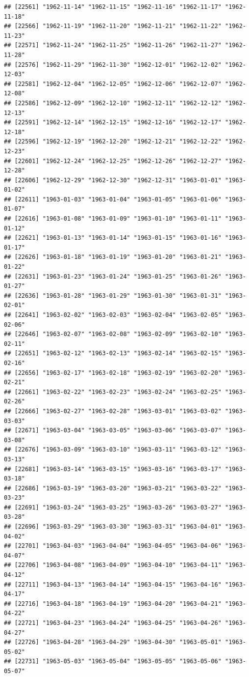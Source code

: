 \documentclass{article}\usepackage[]{graphicx}\usepackage[]{color}
\makeatletter
\newenvironment{kframe}{%
 \def\at@end@of@kframe{}%
 \ifinner\ifhmode%
  \def\at@end@of@kframe{\end{minipage}}%
  \begin{minipage}{\columnwidth}%
 \fi\fi%
 \def\FrameCommand##1{\hskip\@totalleftmargin \hskip-\fboxsep
 \colorbox{shadecolor}{##1}\hskip-\fboxsep
     \hskip-\linewidth \hskip-\@totalleftmargin \hskip\columnwidth}%
 \MakeFramed {\advance\hsize-\width
   \@totalleftmargin\z@ \linewidth\hsize
   \@setminipage}}%
 {\par\unskip\endMakeFramed%
 \at@end@of@kframe}
\newenvironment{knitrout}{}{} %
\makeatother
\begin{document}
\begin{description}
\begin{knitrout}
\begin{kframe}
\begin{verbatim}
## [22561] "1962-11-14" "1962-11-15" "1962-11-16" "1962-11-17" "1962-11-18"
## [22566] "1962-11-19" "1962-11-20" "1962-11-21" "1962-11-22" "1962-11-23"
## [22571] "1962-11-24" "1962-11-25" "1962-11-26" "1962-11-27" "1962-11-28"
## [22576] "1962-11-29" "1962-11-30" "1962-12-01" "1962-12-02" "1962-12-03"
## [22581] "1962-12-04" "1962-12-05" "1962-12-06" "1962-12-07" "1962-12-08"
## [22586] "1962-12-09" "1962-12-10" "1962-12-11" "1962-12-12" "1962-12-13"
## [22591] "1962-12-14" "1962-12-15" "1962-12-16" "1962-12-17" "1962-12-18"
## [22596] "1962-12-19" "1962-12-20" "1962-12-21" "1962-12-22" "1962-12-23"
## [22601] "1962-12-24" "1962-12-25" "1962-12-26" "1962-12-27" "1962-12-28"
## [22606] "1962-12-29" "1962-12-30" "1962-12-31" "1963-01-01" "1963-01-02"
## [22611] "1963-01-03" "1963-01-04" "1963-01-05" "1963-01-06" "1963-01-07"
## [22616] "1963-01-08" "1963-01-09" "1963-01-10" "1963-01-11" "1963-01-12"
## [22621] "1963-01-13" "1963-01-14" "1963-01-15" "1963-01-16" "1963-01-17"
## [22626] "1963-01-18" "1963-01-19" "1963-01-20" "1963-01-21" "1963-01-22"
## [22631] "1963-01-23" "1963-01-24" "1963-01-25" "1963-01-26" "1963-01-27"
## [22636] "1963-01-28" "1963-01-29" "1963-01-30" "1963-01-31" "1963-02-01"
## [22641] "1963-02-02" "1963-02-03" "1963-02-04" "1963-02-05" "1963-02-06"
## [22646] "1963-02-07" "1963-02-08" "1963-02-09" "1963-02-10" "1963-02-11"
## [22651] "1963-02-12" "1963-02-13" "1963-02-14" "1963-02-15" "1963-02-16"
## [22656] "1963-02-17" "1963-02-18" "1963-02-19" "1963-02-20" "1963-02-21"
## [22661] "1963-02-22" "1963-02-23" "1963-02-24" "1963-02-25" "1963-02-26"
## [22666] "1963-02-27" "1963-02-28" "1963-03-01" "1963-03-02" "1963-03-03"
## [22671] "1963-03-04" "1963-03-05" "1963-03-06" "1963-03-07" "1963-03-08"
## [22676] "1963-03-09" "1963-03-10" "1963-03-11" "1963-03-12" "1963-03-13"
## [22681] "1963-03-14" "1963-03-15" "1963-03-16" "1963-03-17" "1963-03-18"
## [22686] "1963-03-19" "1963-03-20" "1963-03-21" "1963-03-22" "1963-03-23"
## [22691] "1963-03-24" "1963-03-25" "1963-03-26" "1963-03-27" "1963-03-28"
## [22696] "1963-03-29" "1963-03-30" "1963-03-31" "1963-04-01" "1963-04-02"
## [22701] "1963-04-03" "1963-04-04" "1963-04-05" "1963-04-06" "1963-04-07"
## [22706] "1963-04-08" "1963-04-09" "1963-04-10" "1963-04-11" "1963-04-12"
## [22711] "1963-04-13" "1963-04-14" "1963-04-15" "1963-04-16" "1963-04-17"
## [22716] "1963-04-18" "1963-04-19" "1963-04-20" "1963-04-21" "1963-04-22"
## [22721] "1963-04-23" "1963-04-24" "1963-04-25" "1963-04-26" "1963-04-27"
## [22726] "1963-04-28" "1963-04-29" "1963-04-30" "1963-05-01" "1963-05-02"
## [22731] "1963-05-03" "1963-05-04" "1963-05-05" "1963-05-06" "1963-05-07"

\end{verbatim}
\end{kframe}
\end{knitrout}
\end{description}
\end{document}
